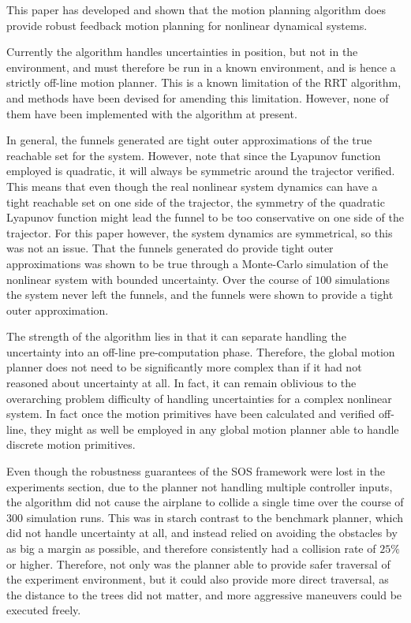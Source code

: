 
This paper has developed and shown that the \rrtfunnel{} motion planning
algorithm does provide robust feedback motion planning for nonlinear dynamical
systems.

Currently the algorithm handles uncertainties in position, but not in the
environment, and must therefore be run in a known environment, and is hence a
strictly off-line motion planner. This is a known limitation of the RRT
algorithm, and methods have been devised for amending this limitation. However,
none of them have been implemented with the \rrtfunnel{} algorithm at present.


In general, the funnels generated are tight outer approximations of the true
reachable set for the system. However, note that since the Lyapunov function
employed is quadratic, it will always be symmetric around the trajector
verified. This means that even though the real nonlinear system dynamics can
have a tight reachable set on one side of the trajector, the symmetry of the
quadratic Lyapunov function might lead the funnel to be too conservative on one
side of the trajector. For this paper however, the system dynamics are
symmetrical, so this was not an issue. That the funnels generated do provide
tight outer approximations was shown to be true through a Monte-Carlo simulation
of the nonlinear system with bounded uncertainty. Over the course of \(100\)
simulations the system never left the funnels, and the funnels were shown to
provide a tight outer approximation.


The strength of the algorithm lies in that it can separate handling the
uncertainty into an off-line pre-computation phase. Therefore, the global motion
planner does not need to be significantly more complex than if it had not
reasoned about uncertainty at all. In fact, it can remain oblivious to the
overarching problem difficulty of handling uncertainties for a complex nonlinear
system. In fact once the motion primitives have been calculated and verified
off-line, they might as well be employed in any global motion planner able to
handle discrete motion primitives.


Even though the robustness guarantees of the SOS framework were lost in the
experiments section, due to the planner not handling multiple controller inputs,
the \rrtfunnel{} algorithm did not cause the airplane to collide a single time
over the course of \(300\) simulation runs. This was in starch contrast to the
benchmark planner, which did not handle uncertainty at all, and instead relied
on avoiding the obstacles by as big a margin as possible, and therefore
consistently had a collision rate of \(25\%\) or higher. Therefore, not only was
the \rrtfunnel{} planner able to provide safer traversal of the experiment
environment, but it could also provide more direct traversal, as the distance to
the trees did not matter, and more aggressive maneuvers could be executed
freely.

